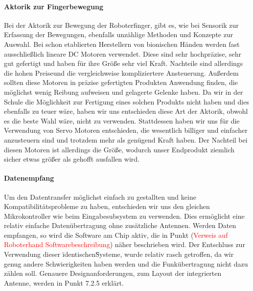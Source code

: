 \documentclass[titlepage,12pt,twoside]{article}
\begin{document}
\paragraph{Aktorik zur Fingerbewegung}
\hfill \break
\hfill \break
Bei der Aktorik zur Bewegung der Roboterfinger, gibt es, wie bei Sensorik zur Erfassung der Bewegungen, ebenfalls unzählige Methoden
und Konzepte zur Auswahl. Bei schon etablierten Herstellern von bionischen Händen werden fast ausschließlich lineare DC Motoren 
verwendet. Diese sind sehr hochpräzise, sehr gut gefertigt und haben für ihre Größe sehr viel Kraft. Nachteile sind allerdings
die hohen Preiseund die vergleichweise kompliziertere Ansteuerung. Außerdem sollten diese Motoren in präzise gefertigten Produkten
Anwendung finden, die möglichst wenig Reibung aufweisen und gelagerte Gelenke haben. Da wir in der Schule die Möglichkeit zur Fertigung 
eines solchen Produkts nicht haben und dies ebenfalls zu teuer wäre, haben wir uns entschieden diese Art der Aktorik, obwohl es die beste Wahl wäre,
nicht zu verwenden. Stattdessen haben wir uns für die Verwendung von Servo Motoren entschieden, die wesentlich billiger und einfacher anzusteuern sind und trotzdem mehr als
genügend Kraft haben. Der Nachteil bei diesen Motoren ist allerdings die Größe, wodurch unser Endprodukt ziemlich sicher etwas größer als gehofft
ausfallen wird. \\

\paragraph{Datenempfang}
\hfill \break
\hfill \break
Um den Datentransfer möglichst einfach zu gestallten und keine Kompatibilitätsprobleme zu haben, entschieden wir uns den gleichen Mikrokontroller
wie beim Eingabesubsystem zu verwenden. Dies ermöglicht eine relativ einfache Datenübertragung ohne zusätzliche Antennen. Werden Daten empfangen,
so wird die Software am Chip aktiv, die in Punkt (\textcolor{red}{Verweis auf Roboterhand Softwarebeschreibung}) näher beschrieben wird. Der
Entschluss zur Verwendung dieser \"identischen\" Systeme, wurde relativ rasch getroffen, da wir genug andere Schwierigkeiten haben werden und 
die Funkübertragung nicht dazu zählen soll. Genauere Designanforderungen, zum Layout der integrierten Antenne, werden in Punkt 7.2.5 erklärt.
\end{document}
